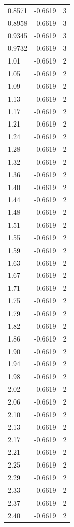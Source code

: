 \begin{longtable}{lrr}
  0.8571 & -0.6619 & 3 \\
  0.8958 & -0.6619 & 3 \\
  0.9345 & -0.6619 & 3 \\
  0.9732 & -0.6619 & 3 \\
  1.01 & -0.6619 & 2 \\
  1.05 & -0.6619 & 2 \\
  1.09 & -0.6619 & 2 \\
  1.13 & -0.6619 & 2 \\
  1.17 & -0.6619 & 2 \\
  1.21 & -0.6619 & 2 \\
  1.24 & -0.6619 & 2 \\
  1.28 & -0.6619 & 2 \\
  1.32 & -0.6619 & 2 \\
  1.36 & -0.6619 & 2 \\
  1.40 & -0.6619 & 2 \\
  1.44 & -0.6619 & 2 \\
  1.48 & -0.6619 & 2 \\
  1.51 & -0.6619 & 2 \\
  1.55 & -0.6619 & 2 \\
  1.59 & -0.6619 & 2 \\
  1.63 & -0.6619 & 2 \\
  1.67 & -0.6619 & 2 \\
  1.71 & -0.6619 & 2 \\
  1.75 & -0.6619 & 2 \\
  1.79 & -0.6619 & 2 \\
  1.82 & -0.6619 & 2 \\
  1.86 & -0.6619 & 2 \\
  1.90 & -0.6619 & 2 \\
  1.94 & -0.6619 & 2 \\
  1.98 & -0.6619 & 2 \\
  2.02 & -0.6619 & 2 \\
  2.06 & -0.6619 & 2 \\
  2.10 & -0.6619 & 2 \\
  2.13 & -0.6619 & 2 \\
  2.17 & -0.6619 & 2 \\
  2.21 & -0.6619 & 2 \\
  2.25 & -0.6619 & 2 \\
  2.29 & -0.6619 & 2 \\
  2.33 & -0.6619 & 2 \\
  2.37 & -0.6619 & 2 \\
  2.40 & -0.6619 & 2 \\

\end{longtable}
